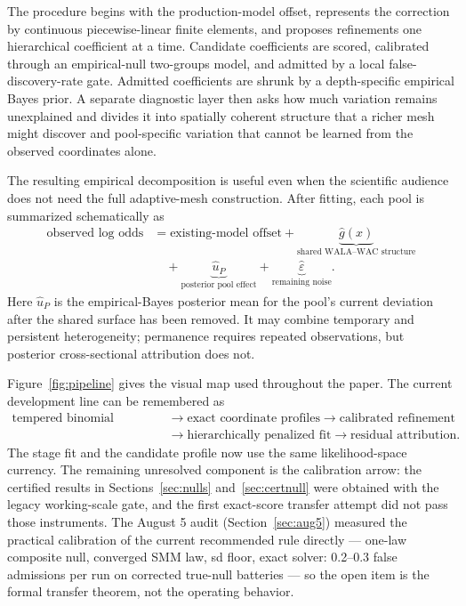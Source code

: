 \documentclass[11pt]{article}
\begin{document}
The procedure begins with the production-model offset, represents the correction by continuous
piecewise-linear finite elements, and proposes refinements one hierarchical coefficient at a time.
Candidate coefficients are scored, calibrated through an empirical-null two-groups model, and admitted
by a local false-discovery-rate gate. Admitted coefficients are shrunk by a depth-specific empirical
Bayes prior. A separate diagnostic layer then asks how much variation remains unexplained and divides
it into spatially coherent structure that a richer mesh might discover and pool-specific variation
that cannot be learned from the observed coordinates alone.

The resulting empirical decomposition is useful even when the scientific audience does not need the
full adaptive-mesh construction. After fitting, each pool is summarized schematically as
\begin{equation}\label{eq:three-way-decomposition}
\begin{aligned}
 \text{observed log odds}
 &= \text{existing-model offset}
 + \underbrace{\hat g(x)}_{\text{shared WALA--WAC structure}}\\
 &\quad + \underbrace{\hat u_P}_{\text{posterior pool effect}}
 + \underbrace{\hat\varepsilon}_{\text{remaining noise}}.
\end{aligned}
\end{equation}
Here $\hat u_P$ is the empirical-Bayes posterior mean for the pool's current deviation after the
shared surface has been removed. It may combine temporary and persistent heterogeneity; permanence
requires repeated observations, but posterior cross-sectional attribution does not.

Figure~\ref{fig:pipeline} gives the visual map used throughout the paper. The current
development line can be remembered as
\[
\begin{aligned}
\text{tempered binomial objective}
&\longrightarrow \text{exact coordinate profiles}
\longrightarrow \text{calibrated refinement}\\
&\longrightarrow \text{hierarchically penalized fit}
\longrightarrow \text{residual attribution}.
\end{aligned}
\]
The stage fit and the candidate profile now use the same likelihood-space currency. The
remaining unresolved component is the calibration arrow: the certified results in
Sections~\ref{sec:nulls} and~\ref{sec:certnull} were obtained with the legacy
working-scale gate, and the first exact-score transfer attempt did not pass those
instruments. The August 5 audit (Section~\ref{sec:aug5}) measured the practical
calibration of the current recommended rule directly --- one-law composite null,
converged SMM law, sd floor, exact solver: 0.2--0.3 false admissions per run on
corrected true-null batteries --- so the open item is the formal transfer theorem, not
the operating behavior.
\end{document}
